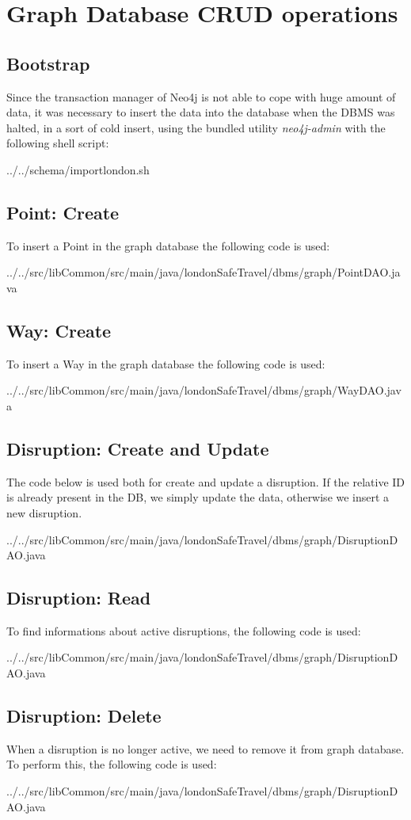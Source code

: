 \chapter{Graph Database CRUD operations}
\section{Bootstrap}
Since the transaction manager of Neo4j is not able to cope with huge amount of data, it was necessary to insert the data into the database when the DBMS was halted, in a sort of cold insert, using the bundled utility \textit{neo4j-admin} with the following shell script:


{../../schema/importlondon.sh}
\section{Point: Create}
To insert a Point in the graph database the following code is used:

{../../src/libCommon/src/main/java/londonSafeTravel/dbms/graph/PointDAO.java}

\section{Way: Create}
To insert a Way in the graph database the following code is used:

{../../src/libCommon/src/main/java/londonSafeTravel/dbms/graph/WayDAO.java}

\section{Disruption: Create and Update}
The code below is used both for create and update a disruption. If the relative ID is already present in the DB, we simply update the data, otherwise we insert a new disruption.

{../../src/libCommon/src/main/java/londonSafeTravel/dbms/graph/DisruptionDAO.java}

\section{Disruption: Read}
To find informations about active disruptions, the following code is used:

{../../src/libCommon/src/main/java/londonSafeTravel/dbms/graph/DisruptionDAO.java}

\section{Disruption: Delete}
When a disruption is no longer active, we need to remove it from graph database. To perform this, the following code is used:

{../../src/libCommon/src/main/java/londonSafeTravel/dbms/graph/DisruptionDAO.java}

